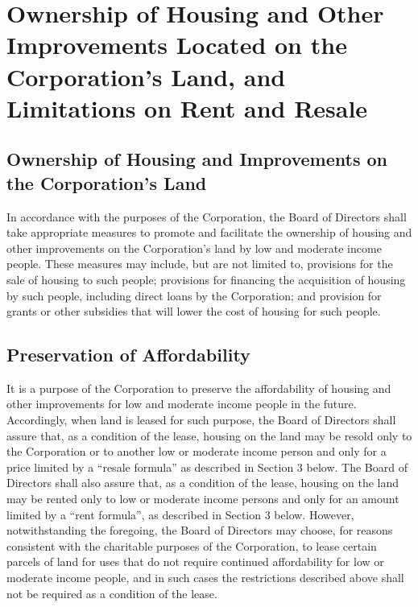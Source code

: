 \section{Ownership of Housing and Other Improvements Located on the Corporation's Land, and Limitations on Rent and Resale}

\subsection{Ownership of Housing and Improvements on the Corporation’s Land}
In accordance with the purposes of the Corporation, the Board of
Directors shall take appropriate measures to promote and facilitate
the ownership of housing and other improvements on the Corporation’s
land by low and moderate income people. These measures may include,
but are not limited to, provisions for the sale of housing to such
people; provisions for financing the acquisition of housing by such
people, including direct loans by the Corporation; and provision for
grants or other subsidies that will lower the cost of housing for such
people.

\subsection{Preservation of Affordability}
It is a purpose of the Corporation to preserve the affordability of
housing and other improvements for low and moderate income people in
the future. Accordingly, when land is leased for such purpose, the
Board of Directors shall assure that, as a condition of the lease,
housing on the land may be resold only to the Corporation or to
another low or moderate income person and only for a price limited by
a “resale formula” as described in Section 3 below. The Board of
Directors shall also assure that, as a condition of the lease, housing
on the land may be rented only to low or moderate income persons and
only for an amount limited by a “rent formula”, as described in
Section 3 below. However, notwithstanding the foregoing, the Board of
Directors may choose, for reasons consistent with the charitable
purposes of the Corporation, to lease certain parcels of land for uses
that do not require continued affordability for low or moderate income
people, and in such cases the restrictions described above shall not
be required as a condition of the lease.

